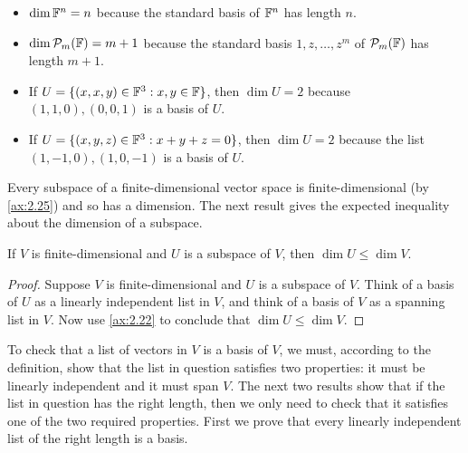 \begin{example}[Dimensions]\label{ax:2.36}\leavevmode
\begin{itemize}
\item $\operatorname{dim}\mathbb{F}^n=n$ because the standard basis of $\mathbb{F}^n$ has length $n$.
\item $\operatorname{dim}\mathcal{P}_m(\mathbb{F})=m+1$ because the standard basis $1,z,\dots,z^m$ of
  $\mathcal{P}_m(\mathbb{F})$ has length $m+1$.
\item If $U=\{(x,x,y)\in\mathbb{F}^3 : x,y\in\mathbb{F}\}$, then $\dim U=2$ because
  $(1,1,0),(0,0,1)$ is a basis of $U$.
\item If $U=\{(x,y,z)\in\mathbb{F}^3 : x+y+z=0\}$, then $\dim U=2$ because the list
  $(1,-1,0),(1,0,-1)$ is a basis of $U$.
\end{itemize}
\end{example}

Every subspace of a finite-dimensional vector space is finite-dimensional
(by \ref{ax:2.25}) and so has a dimension. The next result gives the expected
inequality about the dimension of a subspace.

\begin{result}\label{ax:2.37}
If $V$ is finite-dimensional and $U$ is a subspace of $V$, then
$\dim U\le\dim V$.
\end{result}

\begin{proof}
Suppose $V$ is finite-dimensional and $U$ is a subspace of $V$. Think of a basis
of $U$ as a linearly independent list in $V$, and think of a basis of $V$ as a
spanning list in $V$. Now use \ref{ax:2.22} to conclude that
$\dim U\le\dim V$.
\end{proof}

%
To check that a list of vectors in $V$ is a basis of $V$, we must, according to
the definition, show that the list in question satisfies two properties: it
must be linearly independent and it must span $V$. The next two results show
that if the list in question has the right length, then we only need to check
that it satisfies one of the two required properties. First we prove that every
linearly independent list of the right length is a basis.

